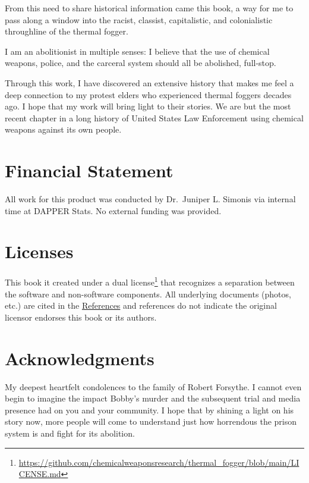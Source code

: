 \documentclass[
  11pt,
  titlepage]{krantz}
\renewcommand{\href}[2]{#2\footnote{\url{#1}}}
\begin{document}
From this need to share historical information came this book, a way for me to pass along a window into the racist, classist, capitalistic, and colonialistic throughline of the thermal fogger.

I am an abolitionist in multiple senses: I believe that the use of chemical weapons, police, and the carceral system should all be abolished, full-stop.

Through this work, I have discovered an extensive history that makes me feel a deep connection to my protest elders who experienced thermal foggers decades ago.
I hope that my work will bring light to their stories.
We are but the most recent chapter in a long history of United States Law Enforcement using chemical weapons against its own people.

\hypertarget{financial-statement}{%
\section*{Financial Statement}\label{financial-statement}}


All work for this product was conducted by Dr.~Juniper L. Simonis via internal time at DAPPER Stats.
No external funding was provided.

\hypertarget{licenses}{%
\section*{Licenses}\label{licenses}}


This book it created under a \href{https://github.com/chemicalweaponsresearch/thermal_fogger/blob/main/LICENSE.md}{dual license} that recognizes a separation between the software and non-software components.
All underlying documents (photos, etc.) are cited in the \protect\hyperlink{References}{References} and references do not indicate the original licensor endorses this book or its authors.

\hypertarget{acknowledgments}{%
\section*{Acknowledgments}\label{acknowledgments}}


My deepest heartfelt condolences to the family of Robert Forsythe.
I cannot even begin to imagine the impact Bobby's murder and the subsequent trial and media presence had on you and your community.
I hope that by shining a light on his story now, more people will come to understand just how horrendous the prison system is and fight for its abolition.
\end{document}
